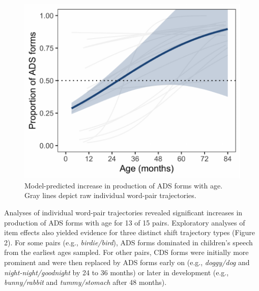 \documentclass[10pt, letterpaper]{article}
\newenvironment{CodeChunk}{}{}
\begin{document}
\begin{CodeChunk}
\begin{figure}[h]

{\centering \includegraphics{figs/shift-timing-fig-1} 

}

\caption[Model-predicted increase in production of ADS forms with age]{Model-predicted increase in production of ADS forms with age. Gray lines depict raw individual word-pair trajectories.}\label{fig:shift-timing-fig}
\end{figure}
\end{CodeChunk}

Analyses of individual word-pair trajectories revealed significant
increases in production of ADS forms with age for 13 of 15 pairs.
Exploratory analyses of item effects also yielded evidence for three
distinct shift trajectory types (Figure 2). For some pairs (e.g.,
\emph{birdie/bird}), ADS forms dominated in children's speech from the
earliest ages sampled. For other pairs, CDS forms were initially more
prominent and were then replaced by ADS forms early on (e.g.,
\emph{doggy/dog} and \emph{night-night/goodnight} by 24 to 36 months) or
later in development (e.g., \emph{bunny/rabbit} and \emph{tummy/stomach}
after 48 months).
\end{document}
